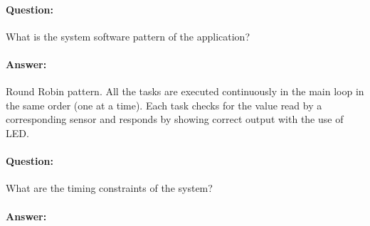 \documentclass[10pt]{article}
\begin{document}
\paragraph{Question:}

What is the system software pattern of the application?

\paragraph{Answer:}

Round Robin pattern. All the tasks are executed continuously in the main loop in
the same order (one at a time). Each task checks for the value read by a
corresponding sensor and responds by showing correct output with the use of LED.

\paragraph{Question:}

What are the timing constraints of the system?

\paragraph{Answer:}

\end{document}
